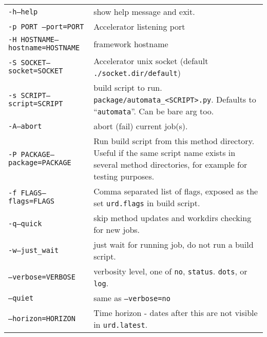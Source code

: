 \begin{snugshade}
\begin{tabular}{p{4cm}p{9cm}}
  \texttt{-h}\hspace{3cm}\texttt{---help} & show help message and
  exit.\\[4ex]

  \texttt{-p PORT }\hspace{3cm}\texttt{---port=PORT} & Accelerator
  listening port\\[4ex]

  \texttt{-H HOSTNAME}\hspace{3cm}\texttt{---hostname=HOSTNAME} &
  framework hostname\\[4ex]
  
  \texttt{-S SOCKET}\hspace{3cm}\texttt{---socket=SOCKET} &
  Accelerator unix socket (default
  \texttt{./socket.dir/default})\\[4ex]

  \texttt{-s SCRIPT}\hspace{1cm}\texttt{---script=SCRIPT} & build
  script to run. \texttt{package/automata\_<SCRIPT>.py}.  Defaults to
  ``\texttt{automata}''.  Can be bare arg too.\\[2ex]

  \texttt{-A}\hspace{3cm}\texttt{---abort} & abort (fail) current
  job(s).\\[4ex]

  \texttt{-P PACKAGE}\hspace{3cm}\texttt{---package=PACKAGE} & Run
  build script from this method directory.  Useful if the same script
  name exists in several method directories, for example for testing
  purposes.\\[2ex]

  \texttt{-f FLAGS}\hspace{3cm}\texttt{---flags=FLAGS} & Comma
  separated list of flags, exposed as the set \texttt{urd.flags} in
  build script.\\[2ex]
  
  \texttt{-q}\hspace{3cm}\texttt{---quick} & skip method updates and
  workdirs checking for new jobs.\\[4ex]

  \texttt{-w}\hspace{3cm}\texttt{---just\_wait} & just wait for running
  job, do not run a build script.\\[4ex]

  \texttt{---verbose=VERBOSE} & verbosity level, one of \texttt{no},
  \texttt{status}. \texttt{dots}, or \texttt{log}.\\[2ex]

  \texttt{---quiet} & same as \texttt{---verbose=no}\\[2ex]

  \texttt{---horizon=HORIZON} & Time horizon - dates after this are
  not visible in \texttt{urd.latest}.\\[4ex]
\end{tabular}
\end{snugshade}
